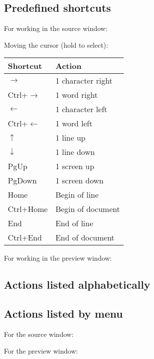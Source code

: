\subsection{Predefined shortcuts}

For working in the source window:


Moving the cursor (hold  to select):
\begin{longtable}{Pl}
\toprule
Shortcut & Action \\
\midrule \endhead
$\rightarrow$      & 1 character right \\
Ctrl+$\rightarrow$ & 1 word right \\
$\leftarrow$       & 1 character left \\
Ctrl+$\leftarrow$  & 1 word left \\
$\uparrow$         & 1 line up \\
$\downarrow$       & 1 line down \\
PgUp               & 1 screen up \\
PgDown             & 1 screen down \\
Home               & Begin of line \\
Ctrl+Home          & Begin of document \\
End                & End of line \\
Ctrl+End           & End of document \\
\bottomrule
\end{longtable}

For working in the preview window:


\subsection{Actions listed alphabetically}


\subsection{Actions listed by menu}

For the source window:


\bigskip
For the preview window:



